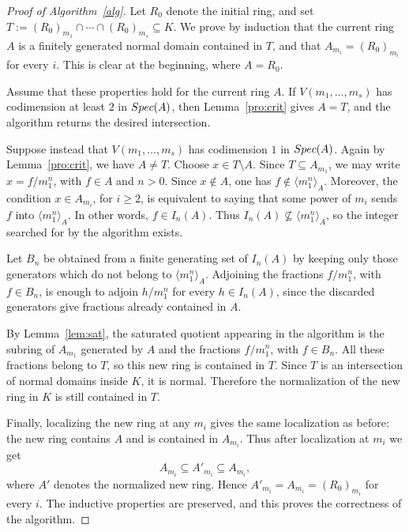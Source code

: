 \documentclass{amsart}
\theoremstyle{definition}
\theoremstyle{remark}
\begin{document}
\begin{proof}[Proof of Algorithm~\ref{alg}]
Let $R_0$ denote the initial ring, and set
$T:= (R_0)_{m_1}\cap\cdots\cap (R_0)_{m_s}\subseteq K$.
We prove by induction that the current ring $A$ is a finitely generated
normal domain contained in $T$, and that
$A_{m_i}=(R_0)_{m_i}$ for every $i$. This is clear at the beginning,
where $A=R_0$.

Assume that these properties hold for the current ring $A$. If
$V(m_1,\dots,m_s)$ has codimension at least $2$ in ${\rm Spec}(A)$, then
Lemma~\ref{pro:crit} gives $A=T$, and the algorithm returns the desired
intersection.

Suppose instead that $V(m_1,\dots,m_s)$ has codimension $1$ in
${\rm Spec}(A)$. Again by Lemma~\ref{pro:crit}, we have $A\neq T$.
Choose $x\in T\setminus A$. Since $T\subseteq A_{m_1}$, we may write
$x=f/m_1^n$, with $f\in A$ and $n>0$. Since $x\notin A$, one has
$f\notin\langle m_1^n\rangle_A$. Moreover, the condition
$x\in A_{m_i}$, for $i\geq 2$, is equivalent to saying that some power of
$m_i$ sends $f$ into $\langle m_1^n\rangle_A$. In other words,
$f\in I_n(A)$. Thus $I_n(A)\not\subseteq \langle m_1^n\rangle_A$, so the
integer searched for by the algorithm exists.

Let $B_n$ be obtained from a finite generating set of $I_n(A)$ by keeping
only those generators which do not belong to $\langle m_1^n\rangle_A$.
Adjoining the fractions $f/m_1^n$, with $f\in B_n$, is enough to adjoin
$h/m_1^n$ for every $h\in I_n(A)$, since the discarded generators give
fractions already contained in $A$.

By Lemma~\ref{lem:sat}, the saturated quotient appearing in the algorithm is
the subring of $A_{m_1}$ generated by $A$ and the fractions
$f/m_1^n$, with $f\in B_n$. All these fractions belong to $T$, so this
new ring is contained in $T$. Since $T$ is an intersection of normal
domains inside $K$, it is normal. Therefore the normalization of the new
ring in $K$ is still contained in $T$.

Finally, localizing the new ring at any $m_i$ gives the same localization as
before: the new ring contains $A$ and is contained in $A_{m_i}$. Thus
after localization at $m_i$ we get
\[
A_{m_i}\subseteq A'_{m_i}\subseteq A_{m_i},
\]
where $A'$ denotes the normalized new ring. Hence
$A'_{m_i}=A_{m_i}=(R_0)_{m_i}$ for every $i$.
The inductive properties are preserved, and this proves the correctness of
the algorithm.
\end{proof}
\end{document}
